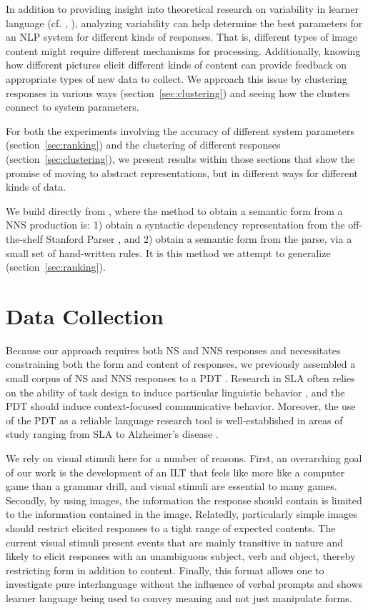 In addition to providing insight into
theoretical research on variability 
in learner language (cf. \citet{ellis1987variability}, \citet{kanno1998consistency}), analyzing variability can help determine
the best parameters for an NLP system for different kinds of
responses.  That is, different types of image content might require
different mechanisms for processing.  Additionally, knowing how
different pictures elicit different kinds of content can provide
feedback on appropriate types of new data to collect.
We approach this issue by clustering responses in various ways
(section~\ref{sec:clustering}) and seeing how the clusters connect to
system parameters.

For both the experiments involving the accuracy of different system
parameters (section~\ref{sec:ranking}) and the clustering of different
responses (section~\ref{sec:clustering}), we present results within
those sections that show the promise of moving to abstract representations, but in
different ways for different kinds of data.

We build directly from \citet{king:dickinson:13,king:dickinson:14},
where the method to obtain a semantic form from a NNS production is:
1) obtain a syntactic dependency representation from the off-the-shelf
Stanford Parser \citep{demarneffe:ea:06, klein:manning:03}, and 2)
obtain a semantic form from the parse, via a small set of hand-written
rules.  It is this method we attempt to generalize
(section~\ref{sec:ranking}).

\section{Data Collection}
\label{sec:data}

Because our approach requires both NS and NNS responses and
necessitates constraining both the form and content of responses, we
previously assembled a small corpus of NS and NNS responses to a PDT
\citep{king:dickinson:13}.  Research in SLA often relies on the
ability of task design to induce particular linguistic behavior
\citep{skehan1998assessing}, and the PDT should induce context-focused
communicative behavior.  Moreover, the use of the PDT as a reliable
language research tool is well-established in areas of study ranging
from SLA to Alzheimer's disease \citep{ellis2000task,
forbes2005detecting}.

We rely on visual stimuli here for a number of reasons. First, an overarching goal of our work is the development of an ILT that feels like more like a computer game than a grammar drill, and visual stimuli are essential to many games.
Secondly, by using images, the information the response should contain is limited
to the information contained in the image. Relatedly, particularly
simple images should restrict elicited responses to a tight range of
expected contents. 
The current visual stimuli present events that are mainly
transitive in nature and likely to elicit responses with an
unambiguous subject, verb and object, thereby restricting form in
addition to content. Finally, this format allows one to investigate
pure interlanguage without the influence of verbal prompts and shows
learner language being used to convey meaning and not just manipulate forms.

